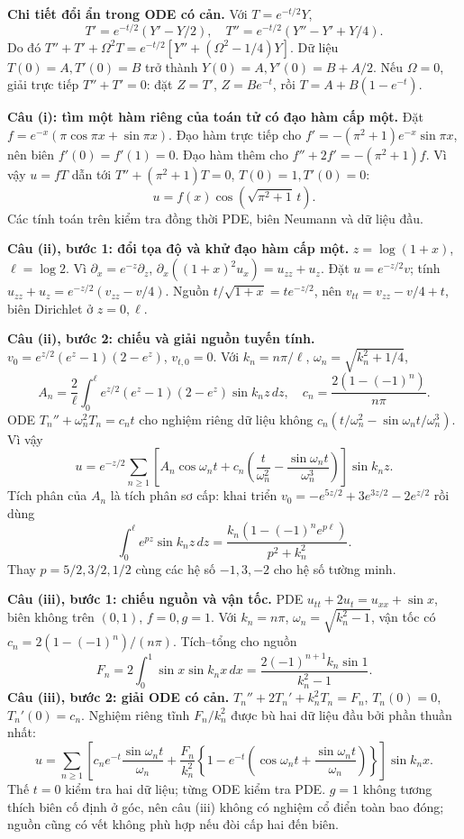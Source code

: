 \textbf{Chi tiết đổi ẩn trong ODE có cản.} Với $T=e^{-t/2}Y$,
\[T'=e^{-t/2}(Y'-Y/2),\quad T''=e^{-t/2}(Y''-Y'+Y/4).\]
Do đó $T''+T'+\Omega^2T=e^{-t/2}[Y''+(\Omega^2-1/4)Y]$. Dữ liệu $T(0)=A,T'(0)=B$ trở thành $Y(0)=A,Y'(0)=B+A/2$. Nếu $\Omega=0$, giải trực tiếp $T''+T'=0$: đặt $Z=T'$, $Z=Be^{-t}$, rồi $T=A+B(1-e^{-t})$.

\textbf{Câu (i): tìm một hàm riêng của toán tử có đạo hàm cấp một.} Đặt $f=e^{-x}(\pi\cos\pi x+\sin\pi x)$. Đạo hàm trực tiếp cho $f'=-(\pi^2+1)e^{-x}\sin\pi x$, nên biên $f'(0)=f'(1)=0$. Đạo hàm thêm cho $f''+2f'=-(\pi^2+1)f$. Vì vậy $u=fT$ dẫn tới $T''+(\pi^2+1)T=0$, $T(0)=1,T'(0)=0$:
\[u=f(x)\cos(\sqrt{\pi^2+1}\,t).\]
Các tính toán trên kiểm tra đồng thời PDE, biên Neumann và dữ liệu đầu.

\textbf{Câu (ii), bước 1: đổi tọa độ và khử đạo hàm cấp một.} $z=\log(1+x)$, $\ell=\log2$. Vì $\partial_x=e^{-z}\partial_z$, $\partial_x((1+x)^2u_x)=u_{zz}+u_z$. Đặt $u=e^{-z/2}v$; tính $u_{zz}+u_z=e^{-z/2}(v_{zz}-v/4)$. Nguồn $t/\sqrt{1+x}=te^{-z/2}$, nên $v_{tt}=v_{zz}-v/4+t$, biên Dirichlet ở $z=0,\ell$.

\textbf{Câu (ii), bước 2: chiếu và giải nguồn tuyến tính.} $v_0=e^{z/2}(e^z-1)(2-e^z)$, $v_{t,0}=0$. Với $k_n=n\pi/\ell$, $\omega_n=\sqrt{k_n^2+1/4}$,
\[A_n=\frac2\ell\int_0^\ell e^{z/2}(e^z-1)(2-e^z)\sin k_nz\,dz,\quad c_n=\frac{2(1-(-1)^n)}{n\pi}.\]
ODE $T_n''+\omega_n^2T_n=c_nt$ cho nghiệm riêng dữ liệu không $c_n(t/\omega_n^2-\sin\omega_nt/\omega_n^3)$. Vì vậy
\[u=e^{-z/2}\sum_{n\ge1}\left[A_n\cos\omega_nt+c_n\left(\frac t{\omega_n^2}-\frac{\sin\omega_nt}{\omega_n^3}\right)\right]\sin k_nz.\]
Tích phân của $A_n$ là tích phân sơ cấp: khai triển $v_0=-e^{5z/2}+3e^{3z/2}-2e^{z/2}$ rồi dùng
\[\int_0^\ell e^{pz}\sin k_nz\,dz=\frac{k_n(1-(-1)^ne^{p\ell})}{p^2+k_n^2}.\]
Thay $p=5/2,3/2,1/2$ cùng các hệ số $-1,3,-2$ cho hệ số tường minh.

\textbf{Câu (iii), bước 1: chiếu nguồn và vận tốc.} PDE $u_{tt}+2u_t=u_{xx}+\sin x$, biên không trên $(0,1)$, $f=0,g=1$. Với $k_n=n\pi$, $\omega_n=\sqrt{k_n^2-1}$, vận tốc có $c_n=2(1-(-1)^n)/(n\pi)$. Tích–tổng cho nguồn
\[F_n=2\int_0^1\sin x\sin k_nx\,dx=\frac{2(-1)^{n+1}k_n\sin1}{k_n^2-1}.\]
\textbf{Câu (iii), bước 2: giải ODE có cản.} $T_n''+2T_n'+k_n^2T_n=F_n$, $T_n(0)=0$, $T_n'(0)=c_n$. Nghiệm riêng tĩnh $F_n/k_n^2$ được bù hai dữ liệu đầu bởi phần thuần nhất:
\[u=\sum_{n\ge1}\left[c_ne^{-t}\frac{\sin\omega_nt}{\omega_n}+\frac{F_n}{k_n^2}\left\{1-e^{-t}\left(\cos\omega_nt+\frac{\sin\omega_nt}{\omega_n}\right)\right\}\right]\sin k_nx.\]
Thế $t=0$ kiểm tra hai dữ liệu; từng ODE kiểm tra PDE. $g=1$ không tương thích biên cố định ở góc, nên câu (iii) không có nghiệm cổ điển toàn bao đóng; nguồn cũng có vết không phù hợp nếu đòi cấp hai đến biên.

